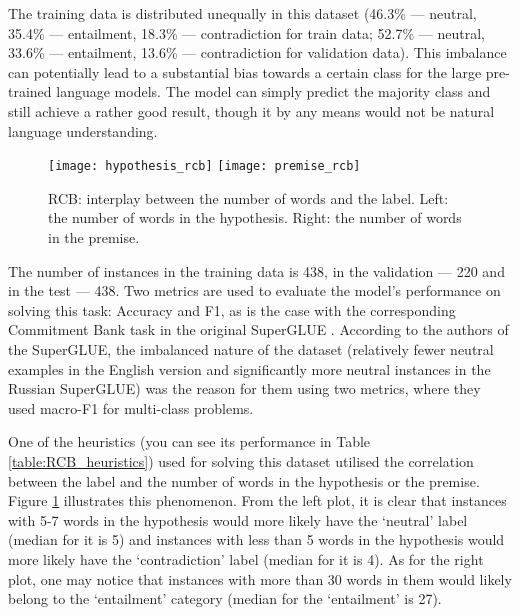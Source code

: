 \documentclass[11pt]{article}
\begin{document}
The training data is distributed unequally in this dataset (46.3\% --- neutral, 35.4\% --- entailment, 18.3\% --- contradiction for train data; 52.7\% --- neutral, 33.6\% --- entailment, 13.6\% --- contradiction for validation data). This imbalance can potentially lead to a substantial bias towards a certain class for the large pre-trained language models. The model can simply predict the majority class and still achieve a rather good result, though it by any means would not be natural language understanding. 

\begin{figure}
\texttt{[image: hypothesis\_rcb]}
\texttt{[image: premise\_rcb]}
\caption{RCB: interplay between the number of words and the label. Left: the number of words in the hypothesis. Right: the number of words in the premise.}
\label{table:RCB_numberofwords}
\end{figure}

The number of instances in the training data is 438, in the validation --- 220 and in the test --- 438. Two metrics are used to evaluate the model's performance on solving this task: Accuracy and F1, as is the case with the corresponding Commitment Bank task in the original SuperGLUE \cite{wang-etal-2018-glue}. According to the authors of the SuperGLUE, the imbalanced nature of the dataset (relatively fewer neutral examples in the English version and significantly more neutral instances in the Russian SuperGLUE) was the reason for them using two metrics, where they used macro-F1 for multi-class problems.

One of the heuristics (you can see its performance in Table \ref{table:RCB_heuristics}) used for solving this dataset utilised the correlation between the label and the number of words in the hypothesis or the premise. 
Figure \ref{table:RCB_numberofwords} illustrates this phenomenon. 
From the left plot, it is clear that instances with 5-7 words in the hypothesis would more likely have the `neutral' label (median for it is 5) and instances with less than 5 words in the hypothesis would more likely have the `contradiction' label (median for it is 4). 
As for the right plot, one may notice that instances with more than 30 words in them would likely belong to the `entailment' category (median for the `entailment' is 27).
\end{document}
